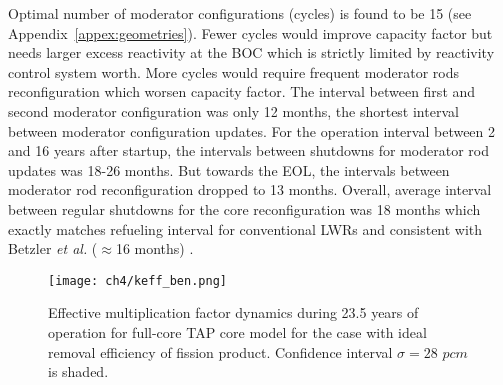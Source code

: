 Optimal number of moderator configurations (cycles) is found to be 15 (see 
Appendix~\ref{appex:geometries}). Fewer cycles would improve capacity factor 
but needs larger excess reactivity at the \gls{BOC} which is strictly limited 
by reactivity control system worth. More cycles would require frequent 
moderator rods reconfiguration which worsen capacity factor.  The interval 
between first and second moderator configuration was only 12 months, the 
shortest interval between moderator configuration updates. For the operation 
interval between 2 and 16 years after startup, the intervals between shutdowns 
for moderator rod updates was 18-26 months. But towards the \gls{EOL}, the 
intervals between moderator rod reconfiguration dropped to 13 months. Overall, 
average interval between regular shutdowns for the core reconfiguration was 18 
months which exactly matches refueling interval for conventional \glspl{LWR}  
and consistent with Betzler \emph{et al.} ($\approx$16 months)  
\cite{betzler_assessment_2017-1}.
\begin{figure}[htp!] %
	\centering
	\texttt{[image: ch4/keff\_ben.png]}
	\caption{Effective multiplication factor dynamics during 23.5 years of 
	operation for full-core \gls{TAP} core model for the case with ideal 
	removal efficiency of fission product. Confidence interval $\sigma=28$ 
	$pcm$ is shaded.}
	\label{fig:keff-ben-valid}
\end{figure}

